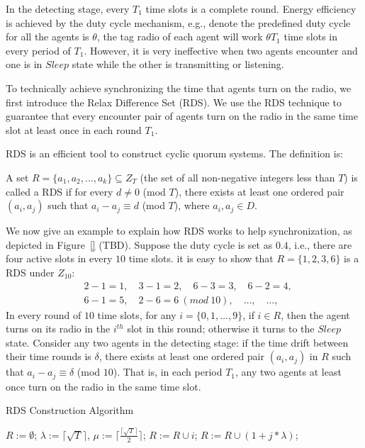 In the detecting stage, every $T_1$ time slots is a complete round.
Energy efficiency is achieved by the duty cycle mechanism, 
e.g., denote the predefined duty cycle for 
all the agents is $\theta$, the tag radio of each agent will work
$\theta T_1$ time slots in every period of $T_1$. However, it is very ineffective
when two agents encounter and one is in $Sleep$ state while the other is transmitting
or listening. 

To technically achieve synchronizing the time that agents turn on the radio,
we first introduce the Relax Difference Set (RDS).
We use the RDS technique to guarantee that every encounter pair 
of agents turn on the radio in the same time slot at least once in each round $T_1$.

RDS is an efficient tool to construct cyclic quorum systems. 
The definition is:
\begin{definition}
A set $R=\{a_1,a_2,...,a_k\} \subseteq Z_T$ (the set of all non-negative integers less than $T$)
is called a RDS if for every $d \neq 0$ (mod $T$),
there exists at least one ordered pair $(a_i,a_j)$ such that $a_i - a_j \equiv d$ (mod $T$), 
where $a_i,a_j \in D$.
\end{definition}

We now give an example to explain how RDS works to help synchronization, 
as depicted in Figure~\ref{} (TBD).
Suppose the duty cycle is set as $0.4$, i.e., there are four active slots 
in every $10$ time slots. it is easy to show that $R=\{1,2,3,6\}$ is a RDS
under $Z_{10}$:
\begin{align*}
    &2 - 1 = 1,\quad 3 - 1 = 2,\quad 6 - 3 = 3,\quad 6 - 2 = 4, \\
    &6 - 1 = 5,\quad {2 - 6 = 6}~{(mod~10)},\quad \dots,\quad \dots, 
\end{align*}
In every round of $10$ time slots, for any $i = \{0,1,\dots,9\}$, if $i \in R$, then
the agent turns on its radio in the $i^{th}$ slot in this round; otherwise it turns to the $Sleep$ state.
Consider any two agents in the detecting stage: if the time drift between their time rounds is $\delta$,
there exists at least one ordered pair $(a_i,a_j)$ in $R$ such that $a_i - a_j \equiv \delta$ (mod $10$).
That is, in each period $T_1$, any two agents at least once turn on the radio in the same time slot.

\begin{algorithm}[!h]
    \caption{RDS Construction Algorithm}
    \label{RDS}
    \begin{algorithmic}[1]
    \STATE $R :=\emptyset$; $\lambda :=\lceil \sqrt{T}  \rceil$,
    $\mu :=\lceil \frac{\lceil \sqrt{T} \rceil}{2} \rceil$;\label{RDSline1}
        \STATE $R :=R \cup i$; \label{RDSline2}
    \ENDFOR
        \STATE $R :=R \cup (1 + j * \lambda )$; \label{RDSline3}
    \ENDFOR
    \end{algorithmic}
\end{algorithm}

